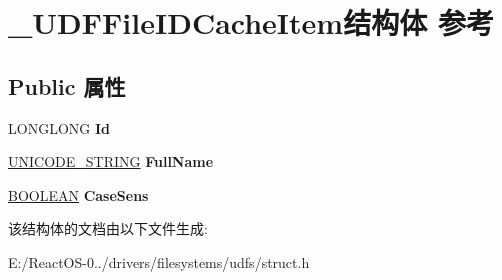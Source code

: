 \hypertarget{struct___u_d_f_file_i_d_cache_item}{}\section{\+\_\+\+U\+D\+F\+File\+I\+D\+Cache\+Item结构体 参考}
\label{struct___u_d_f_file_i_d_cache_item}
\subsection*{Public 属性}
\begin{DoxyCompactItemize}
\item 
\mbox{\label{struct___u_d_f_file_i_d_cache_item_a03dce924dece34b34e1b2416f17bfd7b}} 
L\+O\+N\+G\+L\+O\+NG {\bfseries Id}
\item 
\mbox{\label{struct___u_d_f_file_i_d_cache_item_a3c4ccb27b375bd5d0afdea3f1154be9e}} 
\hyperlink{struct___u_n_i_c_o_d_e___s_t_r_i_n_g}{U\+N\+I\+C\+O\+D\+E\+\_\+\+S\+T\+R\+I\+NG} {\bfseries Full\+Name}
\item 
\mbox{\label{struct___u_d_f_file_i_d_cache_item_aad7cf5770e65ed47783d01576a62e16d}} 
\hyperlink{_processor_bind_8h_a112e3146cb38b6ee95e64d85842e380a}{B\+O\+O\+L\+E\+AN} {\bfseries Case\+Sens}
\end{DoxyCompactItemize}


该结构体的文档由以下文件生成\+:\begin{DoxyCompactItemize}
\item 
E\+:/\+React\+O\+S-\/0../drivers/filesystems/udfs/struct.\+h\end{DoxyCompactItemize}
